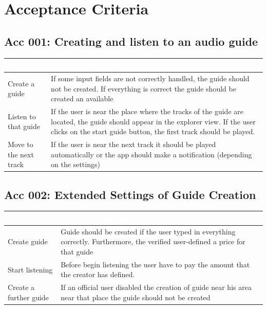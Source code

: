 \documentclass[12pt]{article}
\theoremstyle{definition}
\begin{document}
\pagebreak
\section{Acceptance Criteria}
    \subsection{Acc 001: Creating and listen to an audio guide}
    \label{sec:acc001}
    \begin{tabular}{|p{.3\linewidth}|p{.7\linewidth}|}
        \hline
        \cellcolor[gray]{0.5}\textcolor{white}{Steps} & \cellcolor[gray]{0.5}\textcolor{white}{Expected behaviour} \\ \hline
        Create a guide & If some input fields are not correctly handled, the guide should not be created. If everything is correct the guide should be created an available \\ \hline
        Listen to that guide & If the user is near the place where the tracks of the guide are located, the guide should appear in the explorer view. If the user clicks on the start guide button, the first track should be played. \\ \hline
        Move to the next track & If the user is near the next track it should be played automatically or the app should make a notification (depending on the settings) \\ \hline
    \end{tabular}
    
    \subsection{Acc 002: Extended Settings of Guide Creation}
    \begin{tabular}{|p{.3\linewidth}|p{.7\linewidth}|}
        \hline
        \cellcolor[gray]{0.5}\textcolor{white}{Steps} & \cellcolor[gray]{0.5}\textcolor{white}{Expected behaviour} \\ \hline
        Create guide & Guide should be created if the user typed in everything correctly. Furthermore, the verified user-defined a price for that guide \\ \hline
        Start listening & Before begin listening the user have to pay the amount that the creator has defined. \\ \hline
        Create a further guide & If an official user disabled the creation of guide near his area near that place the guide should not be created \\ \hline
    \end{tabular}
\end{document}
